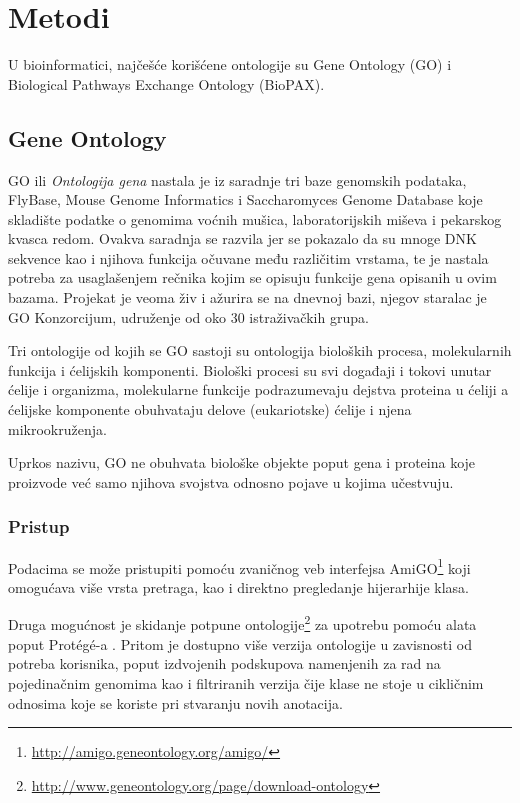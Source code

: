 \section{Metodi}
\label{sec:metodi}

U bioinformatici, najčešće korišćene ontologije su Gene Ontology (GO) i Biological Pathways Exchange Ontology (BioPAX).

\subsection{Gene Ontology}

GO ili \emph{Ontologija gena} nastala je iz saradnje tri baze genomskih podataka, FlyBase, Mouse Genome Informatics i Saccharomyces Genome Database koje skladište podatke o genomima voćnih mušica, laboratorijskih miševa i pekarskog kvasca redom.
Ovakva saradnja se razvila jer se pokazalo da su mnoge DNK sekvence kao i njihova funkcija očuvane među različitim vrstama, te je nastala potreba za usaglašenjem rečnika kojim se opisuju funkcije gena opisanih u ovim bazama. Projekat je veoma živ i ažurira se na dnevnoj bazi, njegov staralac je GO Konzorcijum, udruženje od oko 30 istraživačkih grupa.

Tri ontologije od kojih se GO sastoji su ontologija bioloških procesa, molekularnih funkcija i ćelijskih komponenti. Biološki procesi su svi doga\-đaji i tokovi unutar ćelije i organizma, molekularne funkcije podrazumevaju dejstva proteina u ćeliji a ćelijske komponente obuhvataju delove (eukariotske) ćelije i njena mikrookruženja.

Uprkos nazivu, GO ne obuhvata biološke objekte poput gena i proteina koje proizvode već samo njihova svojstva odnosno pojave u kojima učestvuju. 

\subsubsection{Pristup}
Podacima se može pristupiti pomoću zvaničnog veb interfejsa AmiGO\footnote{\url{http://amigo.geneontology.org/amigo/}} koji omogućava više vrsta pretraga, kao i direktno pregledanje hijerarhije klasa.

Druga mogućnost je skidanje potpune ontologije\footnote{\url{http://www.geneontology.org/page/download-ontology}} za upotrebu pomoću alata poput Protégé-a .
Pritom je dostupno više verzija ontologije u zavisnosti od potreba korisnika, poput izdvojenih podskupova namenjenih za rad na pojedinačnim genomima kao i filtriranih verzija čije klase ne stoje u cikličnim odnosima koje se koriste pri stvaranju novih anotacija.

